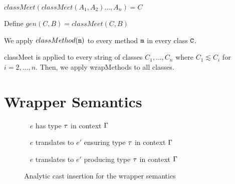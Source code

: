\documentclass{sigplanconf}
\newcommand{\opdef}[2]{\framebox[1.1\width]{#1} ~ #2\\}
\begin{document}
$classMeet(classMeet(A_1,A_2)\ldots,A_n) = C$

Define $gen(C, B) = classMeet(C,B)$

We apply $classMethod(\m)$ to every method $\m$ in every class $\C$.

classMeet is applied to every string of classes $C_1,\ldots,C_n$ where $C_1 \lesssim C_i$ for $i=2,\ldots,n$. Then, we apply wrapMethods to all classes.

\section{Wrapper Semantics}


\begin{figure}
\opdef{$\Gamma\vdash e : \t$}{$e$ has type $\t$ in context $\G$}
\begin{mathpar}



\end{mathpar}
\opdef{$\CICAST{e}{\t}{e'}$}{$e$ translates to $e'$ ensuring type $\t$ in context $\G$}
\begin{mathpar}
\end{mathpar}
\opdef{$\CICAST{e}{\t}{e'}$}{$e$ translates to $e'$ producing type $\t$ in context $\G$}
\begin{mathpar}

\end{mathpar}
\caption{Analytic cast insertion for the wrapper semantics}
\end{figure}
\end{document}
